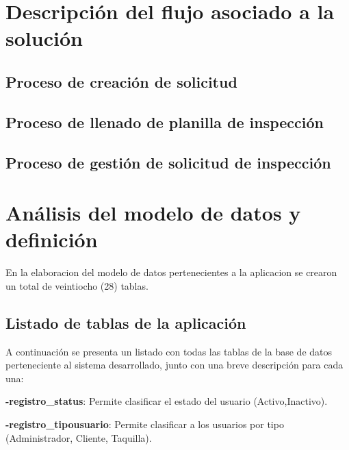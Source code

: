 \setlength{\parskip}{0mm}


\section{Descripción del flujo asociado a la solución} 
\setlength{\parskip}{5mm}
\setlength{\parskip}{0mm}

\subsection{Proceso de creación de solicitud}
\setlength{\parskip}{5mm}
\setlength{\parskip}{0mm}

\subsection{Proceso de llenado de planilla de inspección}
\setlength{\parskip}{5mm}
\setlength{\parskip}{0mm}

\subsection{Proceso de gestión de solicitud de inspección}
\setlength{\parskip}{5mm}
\setlength{\parskip}{0mm}


\section{Análisis del modelo de datos y definición} 
\setlength{\parskip}{5mm}

En la elaboracion del modelo de datos pertenecientes a la aplicacion se crearon un total de veintiocho (28) tablas.

\setlength{\parskip}{0mm}

\subsection{Listado de tablas de la aplicación}

\setlength{\parskip}{5mm}

A continuación se presenta un listado con todas las tablas de la base de datos perteneciente al sistema desarrollado, junto con una breve descripción para cada una:


\textbf{-registro\_status}: Permite clasificar el estado del usuario (Activo,Inactivo).

\textbf{-registro\_tipousuario}: Permite clasificar a los usuarios por tipo (Administrador, Cliente, Taquilla).

